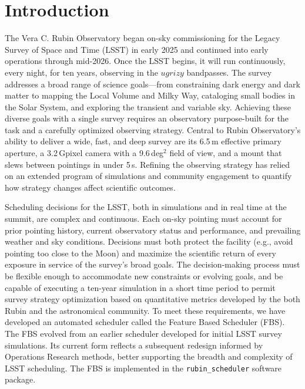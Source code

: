 \section{Introduction}
\label{sec:introduction}

The Vera C. Rubin Observatory began on-sky commissioning for the Legacy Survey
of Space and Time (LSST) in early 2025 and continued into early operations through
mid-2026. Once the LSST begins, it will run continuously, every
night, for ten years, observing in the $ugrizy$ bandpasses. The survey addresses
a broad range of science goals---from constraining dark energy and dark matter to
mapping the Local Volume and Milky Way, cataloging small bodies in the Solar
System, and exploring the transient and variable
sky\cite{2019ApJ...873..111I}. Achieving these diverse goals with a single
survey requires an observatory purpose-built for the task and a carefully
optimized observing strategy. Central to Rubin Observatory's ability to deliver a
wide, fast, and deep survey are its 6.5\,m effective primary aperture, a
3.2\,Gpixel camera with a 9.6\,deg$^{2}$ field of view, and a mount that slews
between pointings in under 5\,s. Refining the observing strategy has relied on
an extended program of simulations and community engagement to quantify how
strategy changes affect scientific outcomes.

Scheduling decisions for the LSST, both in simulations and in real time at the
summit, are complex and continuous. Each on-sky pointing must account for prior
pointing history, current observatory status and performance, and prevailing
weather and sky conditions. Decisions must both protect the facility (e.g.,
avoid pointing too close to the Moon) and maximize the scientific return of every
exposure in service of the survey's broad goals. The decision-making process must
be flexible enough to accommodate new constraints or evolving goals, and be
capable of executing a ten-year simulation in a short time period to permit
survey strategy optimization based on quantitative metrics developed by the
both Rubin and the astronomical community.  To meet these requirements, we have
developed an automated scheduler called the Feature Based Scheduler (FBS). The
FBS evolved from an earlier scheduler developed for initial LSST survey
simulations\cite{2016SPIE.9910E..13D}. Its current form reflects a subsequent redesign
informed by Operations Research methods, better supporting the breadth and
complexity of LSST scheduling\cite{2019AJ....157..151N}.  The FBS is implemented in the
\texttt{rubin\_scheduler} software package\cite{peter_yoachim_2026_18395761}.

